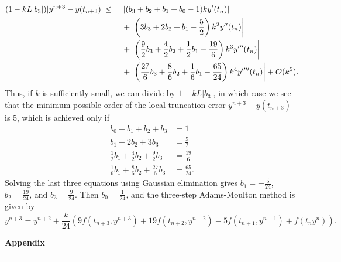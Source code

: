 \documentclass{homework}
\begin{document}
	\begin{alignat*}{2}
		(1-kL|b_3|)|y^{n+3} - y(t_{n+3})| &\le{}& &\left|(b_3 + b_2 + b_1 + b_0 - 1)ky'(t_n)\right| \\
		&&& + \left|\left(3b_3 + 2b_2 + b_1 -\frac{5}{2}\right)k^2y''(t_n)\right|\\
		&&& + \left|\left(\frac{9}{2}b_3 + \frac{4}{2}b_2 + \frac{1}{2}b_1 -\frac{19}{6}\right)k^3y'''(t_n)\right| \\
		&&& + \left|\left(\frac{27}{6}b_3 + \frac{8}{6}b_2 + \frac{1}{6}b_1-\frac{65}{24}\right)k^4y''''(t_n)\right| + \mathcal{O}(k^5).
	\end{alignat*}
	Thus, if $k$ is sufficiently small, we can divide by $1-kL|b_3|$, in which case we see that the minimum possible order of the local truncation error $y^{n+3} - y(t_{n+3})$ is 5, which is achieved only if
	\begin{align*}
		b_0 + b_1 + b_2 + b_3 &= 1 \\
		b_1 + 2b_2 + 3b_3 &= \frac{5}{2} \\
		\frac{1}{2}b_1 + \frac{4}{2}b_2 + \frac{9}{2}b_3 &= \frac{19}{6} \\
		\frac{1}{6}b_1 + \frac{8}{6}b_2 + \frac{27}{6}b_3 &= \frac{65}{24}.
	\end{align*}
	Solving the last three equations using Gaussian elimination gives $b_1 = -\frac{5}{24}$, $b_2 = \frac{19}{24}$, and $b_3 = \frac{9}{24}$. Then $b_0 = \frac{1}{24}$, and the three-step Adams-Moulton method is given by
	\begin{equation*}
		y^{n+3} = y^{n+2} + \frac{k}{24}\left(9f(t_{n+3}, y^{n+3}) + 19f(t_{n+2}, y^{n+2}) -5f(t_{n+1}, y^{n+1}) + f(t_n y^n)\right).
	\end{equation*}
	
	\newpage
	{\large\bf Appendix}
	\hrule
	
	\begin{minipage}{\linewidth}
	
	\end{minipage}
	
	\begin{minipage}{\linewidth}
	
	\end{minipage}
	
	\begin{minipage}{\linewidth}
	
	\end{minipage}
	
	\begin{minipage}{\linewidth}
	
	\end{minipage}
\end{document}
